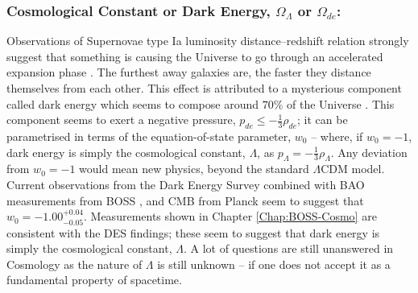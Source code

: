 \subsubsection{Cosmological Constant or Dark Energy, $\Omega_{\Lambda}$ or $\Omega_{de}$:}
Observations of Supernovae type Ia luminosity distance--redshift relation strongly suggest that something is causing the Universe to go through an accelerated expansion phase \citep{1998Riess,1999Perlmutter,2018LambdaCentury}. The furthest away galaxies are, the faster they distance themselves from each other. This effect is attributed to a mysterious component called dark energy which seems to compose around $70\%$ of the Universe \citep{2018PlanckCosmology}. This component seems to exert a negative pressure, $p_{de} \leq - \frac{1}{3}\rho_{de}$; it can be parametrised in terms of the equation-of-state parameter, $w_0$ -- where, if $w_0 = -1$, dark energy is simply the cosmological constant, $\Lambda$, as $p_{\Lambda}= -\frac{1}{3}\rho_{\Lambda}$. Any deviation from $w_0 = -1$ would mean new physics, beyond the standard $\Lambda$CDM model. Current observations from the Dark Energy Survey combined with BAO measurements from BOSS \citep{2016BOSSCosmology}, and CMB from Planck \citep{PlanckCosmology2016} seem to suggest that $w_0 = -1.00^{+0.04}_{-0.05}$. Measurements shown in Chapter \ref{Chap:BOSS-Cosmo} are consistent with the DES findings; these seem to suggest that dark energy is simply the cosmological constant, $\Lambda$. A lot of questions are still unanswered in Cosmology as the nature of $\Lambda$ is still unknown -- if one does not accept it as a fundamental property of spacetime.

